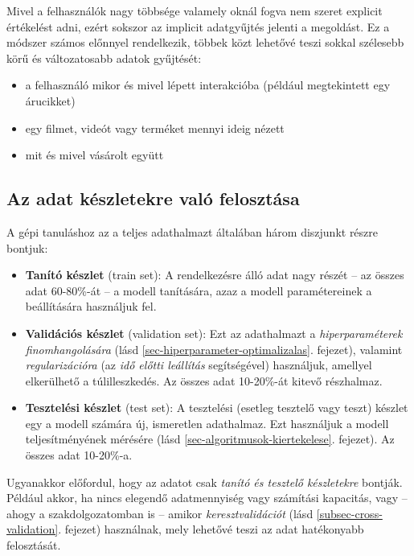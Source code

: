 \documentclass[
]{thesis-ekf}
\theoremstyle{definition}
\theoremstyle{remark}
\begin{document}
Mivel a felhasználók nagy többsége valamely oknál fogva nem szeret explicit értékelést adni, ezért sokszor az implicit adatgyűjtés jelenti a megoldást. Ez a módszer számos előnnyel rendelkezik, többek közt lehetővé teszi sokkal szélesebb körű és változatosabb adatok gyűjtését:

\begin{itemize}
	\item a felhasználó mikor és mivel lépett interakcióba (például megtekintett egy árucikket)
	\item egy filmet, videót vagy terméket mennyi ideig nézett
	\item mit és mivel vásárolt együtt
\end{itemize}

\subsection{Az adat készletekre való felosztása}
\label{az-adat-keszletekre-valo-felosztasa}
A gépi tanuláshoz az a teljes adathalmazt általában három diszjunkt részre bontjuk:
\begin{itemize}
	\item \textbf{Tanító készlet} (train set): A rendelkezésre álló adat nagy részét -- az összes adat 60-80\%-át -- a modell tanítására, azaz a modell paramétereinek a beállítására használjuk fel.
	
	\item \textbf{Validációs készlet} (validation set): Ezt az adathalmazt a \emph{hiperparaméterek finomhangolására} (lásd \ref{sec-hiperparameter-optimalizalas}. fejezet), valamint \emph{regularizációra} (az \emph{idő előtti leállítás} segítségével) használjuk, amellyel elkerülhető a túlilleszkedés. Az összes adat 10-20\%-át kitevő részhalmaz.
	
	\item \textbf{Tesztelési készlet} (test set): A tesztelési (esetleg tesztelő vagy teszt) készlet egy a modell számára új, ismeretlen adathalmaz. Ezt használjuk a modell teljesítményének mérésére (lásd \ref{sec-algoritmusok-kiertekelese}. fejezet). Az összes adat 10-20\%-a.

\end{itemize}\cite{introduction-to-statistical-learning}

Ugyanakkor előfordul, hogy az adatot csak \emph{tanító és tesztelő készletekre} bontják. Például akkor, ha nincs elegendő adatmennyiség vagy számítási kapacitás, vagy -- ahogy a szakdolgozatomban is -- amikor \emph{keresztvalidációt} (lásd \ref{subsec-cross-validation}. fejezet) használnak, mely lehetővé teszi az adat hatékonyabb felosztását.
\end{document}
